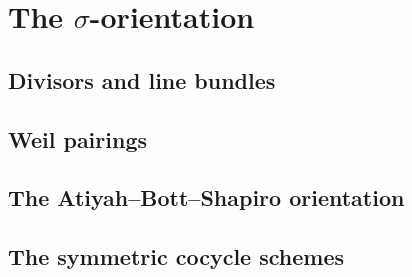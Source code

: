 
\chapter{The $\sigma$-orientation}





\section{Divisors and line bundles}

\section{Weil pairings}

\section{The Atiyah--Bott--Shapiro orientation}

\section{The symmetric cocycle schemes}
